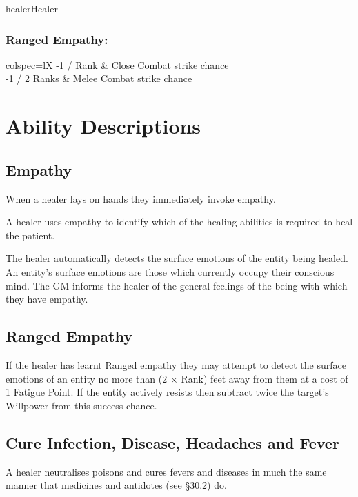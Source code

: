\begin{Skill}[1.4]{healer}{Healer}
\subsubsection{Ranged Empathy:}

\begin{dqtblr}{colspec={lX}}
-1 / Rank	& Close Combat strike chance \\
-1 / 2 Ranks	& Melee Combat strike chance \\
\end{dqtblr}

\section{Ability Descriptions}

\subsection{Empathy}

When a healer lays on hands they immediately invoke empathy.

A healer uses empathy to identify which of the healing abilities is
required to heal the patient.

The healer automatically detects the surface emotions of the entity
being healed. An entity’s surface emotions are those which currently
occupy their conscious mind. The GM informs the healer of the general
feelings of the being with which they have empathy.

\subsection{Ranged Empathy}

If the healer has learnt Ranged empathy they may attempt to detect the
surface emotions of an entity no more than (2 × Rank) feet away from
them at a cost of 1 Fatigue Point. If the entity actively resists then
subtract twice the target’s Willpower from this success chance.

\subsection{Cure Infection, Disease, Headaches and Fever}

A healer neutralises poisons and cures fevers and diseases in much the
same manner that medicines and antidotes (see §30.2) do.


\end{Skill}
